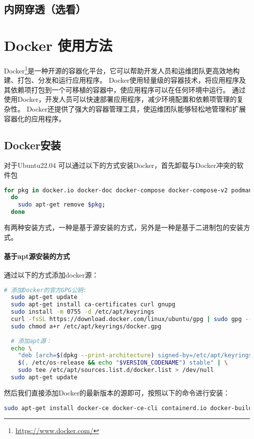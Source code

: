 \documentclass[lang=cn,a4paper,newtx]{elegantpaper}
\begin{document}
\subsection{内网穿透（选看）}
\section{Docker 使用方法}
Docker\footnote{\url{https://www.docker.com/}}是一种开源的容器化平台，它可以帮助开发人员和运维团队更高效地构建、打包、分发和运行应用程序。
Docker使用轻量级的容器技术，将应用程序及其依赖项打包到一个可移植的容器中，使应用程序可以在任何环境中运行。
通过使用Docker，开发人员可以快速部署应用程序，减少环境配置和依赖项管理的复杂性。
Docker还提供了强大的容器管理工具，使运维团队能够轻松地管理和扩展容器化的应用程序。
\subsection{Docker安装}
对于Ubuntu22.04 可以通过以下的方式安装Docker，首先卸载与Docker冲突的软件包
\begin{lstlisting}[language=bash]
  for pkg in docker.io docker-doc docker-compose docker-compose-v2 podman-docker containerd runc;
  do 
    sudo apt-get remove $pkg;
  done
\end{lstlisting}

有两种安装方式，一种是基于源安装的方式，另外是一种是基于二进制包的安装方式。
\paragraph{基于apt源安装的方式}
通过以下的方式添加docker源：
\begin{lstlisting}[language=bash]
  # 添加Docker的官方GPG公钥:
  sudo apt-get update
  sudo apt-get install ca-certificates curl gnupg
  sudo install -m 0755 -d /etc/apt/keyrings
  curl -fsSL https://download.docker.com/linux/ubuntu/gpg | sudo gpg --dearmor -o /etc/apt/keyrings/docker.gpg
  sudo chmod a+r /etc/apt/keyrings/docker.gpg
  
  # 添加apt源：
  echo \
    "deb [arch=$(dpkg --print-architecture) signed-by=/etc/apt/keyrings/docker.gpg] https://download.docker.com/linux/ubuntu \
    $(. /etc/os-release && echo "$VERSION_CODENAME") stable" | \
    sudo tee /etc/apt/sources.list.d/docker.list > /dev/null
  sudo apt-get update
\end{lstlisting}

然后我们直接添加Docker的最新版本的源即可，按照以下的命令进行安装：
\begin{lstlisting}[language=bash]
  sudo apt-get install docker-ce docker-ce-cli containerd.io docker-buildx-plugin docker-compose-plugin
\end{lstlisting}
\end{document}
